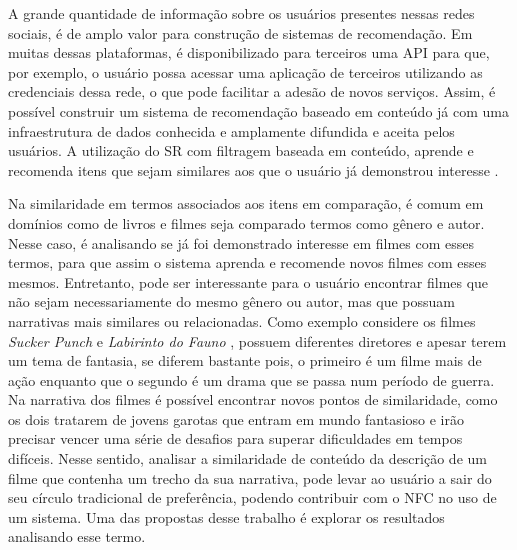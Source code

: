 A grande quantidade de informação sobre os usuários presentes nessas redes sociais, é de amplo valor para construção de sistemas de recomendação. Em muitas dessas plataformas, é disponibilizado para terceiros uma \ac{API} para que, por exemplo, o usuário possa acessar uma aplicação de terceiros utilizando as credenciais dessa rede, o que pode facilitar a adesão de novos serviços. Assim, é possível construir um sistema de recomendação baseado em conteúdo já com uma infraestrutura de dados conhecida e amplamente difundida e aceita pelos usuários. A utilização do \ac{SR} com filtragem baseada em conteúdo, aprende e recomenda itens que sejam similares aos que o usuário já demonstrou interesse \citep{Ricci2011}.

Na similaridade em termos associados aos itens em comparação, é comum em domínios como de livros e filmes seja comparado termos como gênero e autor. Nesse caso, é analisando se já foi demonstrado interesse em filmes com esses termos, para que assim o sistema aprenda e recomende novos filmes com esses mesmos. Entretanto, pode ser interessante para o usuário encontrar filmes que não sejam necessariamente do mesmo gênero ou autor, mas que possuam narrativas mais similares ou relacionadas. Como exemplo considere os filmes \textit{Sucker Punch} \citep{SuckerPunch2011} e \textit{Labirinto do Fauno} \citep{LaberintoFauno2006}, possuem diferentes diretores e apesar terem um tema de fantasia, se diferem bastante pois, o primeiro é um filme mais de ação enquanto que o segundo é um drama que se passa num período de guerra. Na narrativa dos filmes é possível encontrar novos pontos de similaridade, como os dois tratarem de jovens garotas que entram em mundo fantasioso e irão precisar vencer uma série de desafios para superar dificuldades em tempos difíceis. Nesse sentido, analisar a similaridade de conteúdo da descrição de um filme que contenha um trecho da sua narrativa, pode levar ao usuário a sair do seu círculo tradicional de preferência, podendo contribuir com o NFC no uso de um sistema. Uma das propostas desse trabalho é explorar os resultados analisando esse termo.

